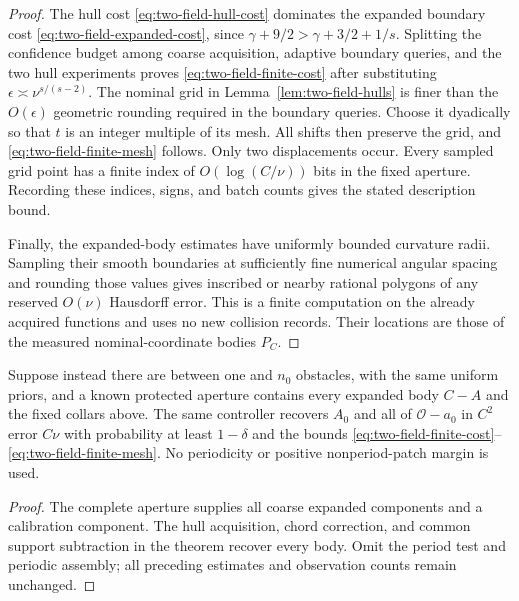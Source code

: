 \begin{proof}
The hull cost \eqref{eq:two-field-hull-cost} dominates the expanded
boundary cost \eqref{eq:two-field-expanded-cost}, since
$\gamma+9/2>\gamma+3/2+1/s$.  Splitting the confidence budget among
coarse acquisition, adaptive boundary queries, and the two hull
experiments proves \eqref{eq:two-field-finite-cost} after substituting
$\epsilon\asymp\nu^{s/(s-2)}$.
The nominal grid in Lemma~\ref{lem:two-field-hulls} is finer than the
$O(\epsilon)$ geometric rounding required in the boundary queries.
Choose it dyadically so that $t$ is an integer multiple of its mesh.
All shifts then preserve the grid, and
\eqref{eq:two-field-finite-mesh} follows.  Only two displacements
occur.  Every sampled grid point has a finite index of
$O(\log(C/\nu))$ bits in the fixed aperture.  Recording these indices,
signs, and batch counts gives the stated description bound.

Finally, the expanded-body estimates have uniformly bounded curvature
radii.  Sampling their smooth boundaries at sufficiently fine
numerical angular spacing and rounding those values gives inscribed
or nearby rational polygons of any reserved $O(\nu)$ Hausdorff error.
This is a finite computation on the already acquired functions and
uses no new collision records.  Their locations are those of the
measured nominal-coordinate bodies $P_C$.
\end{proof}

\begin{corollary}
\label{cor:two-field-finite-cloud}
Suppose instead there are between one and $n_0$ obstacles, with the
same uniform priors, and a known protected aperture contains every
expanded body $C-A$ and the fixed collars above.  The same controller
recovers $A_0$ and all of $\mathcal O-a_0$ in $C^2$ error $C\nu$
with probability at least $1-\delta$ and the bounds
\eqref{eq:two-field-finite-cost}--\eqref{eq:two-field-finite-mesh}.
No periodicity or positive nonperiod-patch margin is used.
\end{corollary}
\begin{proof}
The complete aperture supplies all coarse expanded components and a
calibration component.  The hull acquisition, chord correction, and
common support subtraction in the theorem recover every body.
Omit the period test and periodic assembly; all preceding estimates
and observation counts remain unchanged.
\end{proof}

